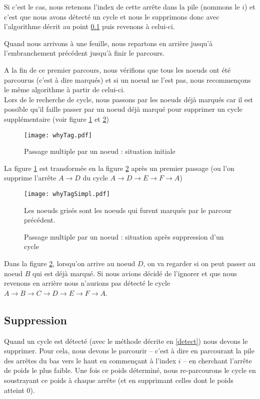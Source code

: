 \documentclass[12pt, oneside]{article}
\begin{document}
Si c'est le cas, nous retenons l'index de cette arrête dans la pile (nommons le $i$) et c'est que nous avons détecté un cycle et nous le supprimons donc avec l'algorithme décrit au point \ref{del} puis revenons à celui-ci.

Quand nous arrivons à une feuille, nous repartons en arrière jusqu'à l'embranchement précédent jusqu'à finir le parcours.

A la fin de ce premier parcours, nous vérifions que tous les noeuds ont été parcourus (c'est à dire marqués) et si un noeud ne l'est pas, nous recommençons le même algorithme à partir de celui-ci.\\

Lors de le recherche de cycle, nous passons par les noeuds déjà marqués car il est possible qu'il faille passer par un noeud déjà marqué pour supprimer un cycle supplémentaire (voir figure \ref{whyTag} et \ref{whyTagSimpl})


\begin{figure}[h]
   \caption{\label{whyTag} Passage multiple par un noeud : situation initiale}
   \center
   \texttt{[image: whyTag.pdf]}
\end{figure}

La figure \ref{whyTag} est transformée en la figure \ref{whyTagSimpl} après un premier passage
(ou l'on supprime l'arrête $A \rightarrow D$ du cycle $A \rightarrow D \rightarrow E \rightarrow F \rightarrow A$)

\begin{figure}[h]
   \caption{\label{whyTagSimpl} Passage multiple par un noeud : situation après suppression d'un cycle}
   \center
   \texttt{[image: whyTagSimpl.pdf]}

   Les noeuds grisés sont les noeuds qui furent marqués par le parcour précédent.
\end{figure}


Dans la figure \ref{whyTagSimpl}, lorsqu'on arrive au noeud $D$, on va regarder si on peut passer au noeud $B$ qui est déjà marqué. Si nous avions décidé de l'ignorer et que nous revenons en arrière nous n'aurions pas détecté le cycle $A \rightarrow B \rightarrow C \rightarrow D \rightarrow E \rightarrow F \rightarrow A$.

\subsection{Suppression}
\label{del}

Quand un cycle est détecté (avec le méthode décrite en \ref{detect}) nous devons le supprimer. Pour cela, nous devons le parcourir -- c'est à dire en parcourant la pile des arrêtes du bas vers le haut en commençant à l'index $i$ -- en cherchant l'arrête de poids le plus faible. Une fois ce poids déterminé, nous re-parcourons le cycle en soustrayant ce poids à chaque arrête (et en supprimant celles dont le poids atteint 0).
\end{document}

